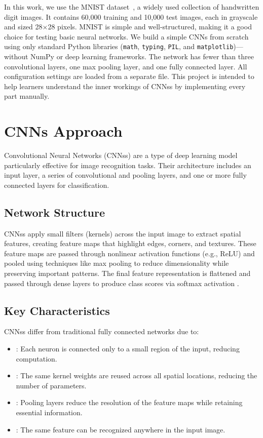 \documentclass[conference]{IEEEtran}
\begin{document}
In this work, we use the MNIST dataset~\cite{lecun2010mnist}, a widely used collection of handwritten digit images. It contains 60{,}000 training and 10{,}000 test images, each in grayscale and sized 28$\times$28 pixels. MNIST is simple and well-structured, making it a good choice for testing basic neural networks. We build a simple CNNs from scratch using only standard Python libraries (\texttt{math}, \texttt{typing}, \texttt{PIL}, and \texttt{matplotlib})—without NumPy or deep learning frameworks. The network has fewer than three convolutional layers, one max pooling layer, and one fully connected layer. All configuration settings are loaded from a separate file. This project is intended to help learners understand the inner workings of CNNss by implementing every part manually.

\section{CNNs Approach}

Convolutional Neural Networks (CNNss) are a type of deep learning model particularly effective for image recognition tasks. Their architecture includes an input layer, a series of convolutional and pooling layers, and one or more fully connected layers for classification.

\subsection{Network Structure}
CNNss apply small filters (kernels) across the input image to extract spatial features, creating feature maps that highlight edges, corners, and textures. These feature maps are passed through nonlinear activation functions (e.g., ReLU) and pooled using techniques like max pooling to reduce dimensionality while preserving important patterns. The final feature representation is flattened and passed through dense layers to produce class scores via softmax activation \cite{shao2023mnist}.

\subsection{Key Characteristics}
CNNss differ from traditional fully connected networks due to:

\begin{itemize}
\item {}: Each neuron is connected only to a small region of the input, reducing computation.
\item {}: The same kernel weights are reused across all spatial locations, reducing the number of parameters.
\item {}: Pooling layers reduce the resolution of the feature maps while retaining essential information.
\item {}: The same feature can be recognized anywhere in the input image.
\end{itemize}
\end{document}
